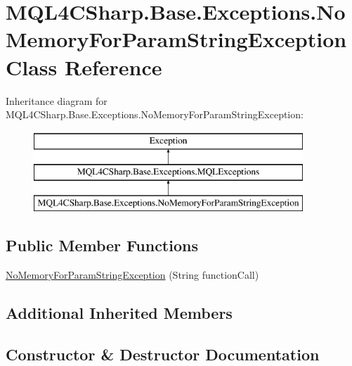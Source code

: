 \hypertarget{class_m_q_l4_c_sharp_1_1_base_1_1_exceptions_1_1_no_memory_for_param_string_exception}{}\section{M\+Q\+L4\+C\+Sharp.\+Base.\+Exceptions.\+No\+Memory\+For\+Param\+String\+Exception Class Reference}
\label{class_m_q_l4_c_sharp_1_1_base_1_1_exceptions_1_1_no_memory_for_param_string_exception}
Inheritance diagram for M\+Q\+L4\+C\+Sharp.\+Base.\+Exceptions.\+No\+Memory\+For\+Param\+String\+Exception\+:\begin{figure}[H]
\begin{center}
\leavevmode
\includegraphics[height=3.000000cm]{class_m_q_l4_c_sharp_1_1_base_1_1_exceptions_1_1_no_memory_for_param_string_exception}
\end{center}
\end{figure}
\subsection*{Public Member Functions}
\begin{DoxyCompactItemize}
\item 
\hyperlink{class_m_q_l4_c_sharp_1_1_base_1_1_exceptions_1_1_no_memory_for_param_string_exception_ab3f123c4d2cf67747395ee36f8dfb13d}{No\+Memory\+For\+Param\+String\+Exception} (String function\+Call)
\end{DoxyCompactItemize}
\subsection*{Additional Inherited Members}


\subsection{Constructor \& Destructor Documentation}
